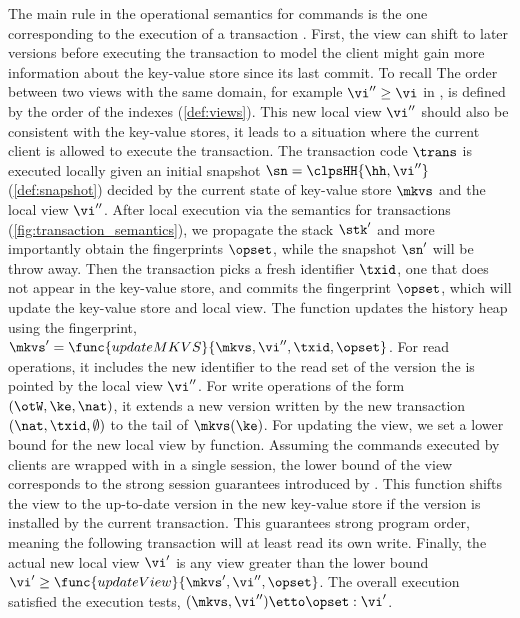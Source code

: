 The main rule in the operational semantics for commands is the one corresponding to the execution of a transaction .
First, the view can shift to later versions before executing the transaction to model the client might gain more information about the key-value store since its last commit.
To recall The order between two views with the same domain, for example \( \vi'' \geq \vi \) in , is defined by the order of the indexes (\cref{def:views}).
This new local view \( \vi'' \) should also be consistent with the key-value stores, \ie it leads to a situation where the current client is allowed to execute the transaction.
The transaction code \( \trans \) is executed locally given an initial snapshot \( \sn = \clpsHH{\hh, \vi''}\) (\cref{def:snapshot}) decided by the current state of key-value store \( \mkvs \) and the local view \( \vi'' \).
After local execution via the semantics for transactions (\cref{fig:transaction_semantics}), we propagate the stack \( \stk' \) and more importantly obtain the fingerprints \( \opset \), while the snapshot \( \sn' \) will be throw away.
Then the transaction picks a fresh identifier \( \txid \), \ie one that does not appear in the key-value store, and commits the fingerprint \( \opset \), which will update the key-value store and local view.
The  function updates the history heap using the fingerprint, \( \mkvs' = \func{updateMKVS}{\mkvs,\vi'',\txid, \opset}\).
For read operations, it includes the new identifier to the read set of the version the is pointed by the local view \( \vi''\).
For write operations of the form \( (\otW, \ke, \nat) \), it extends a new version written by the new transaction \( (\nat, \txid, \emptyset) \) to the tail of \( \mkvs(\ke) \).
For updating the view, we set a lower bound for the new local view by  function.
Assuming the commands executed by clients are wrapped with in a single session, the lower bound of the view corresponds to the strong session guarantees introduced by \cite{.........}.
This function shifts the view to the up-to-date version in the new key-value store if the version is installed by the current transaction.
This guarantees strong program order, meaning the following transaction will at least read its own write.
Finally, the actual new local view \( \vi' \) is any view greater than the lower bound \( \vi' \geq \func{updateView}{\mkvs', \vi'', \opset}\).
The overall execution satisfied the execution tests, \ie \( (\mkvs, \vi'') \etto \opset : \vi'\).

